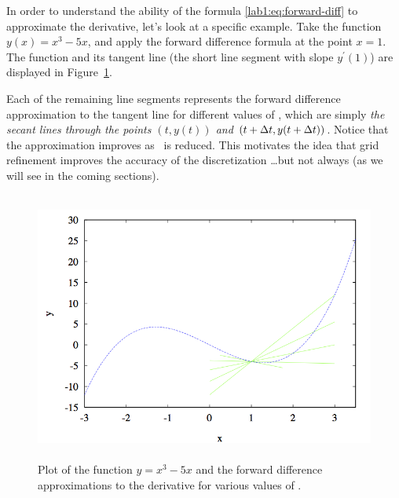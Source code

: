 \begin{example}
\begin{latexonly}
  In order to understand the ability of the formula
  \eqref{lab1:eq:forward-diff} to approximate the derivative, 
  let's look at a specific example.
  Take the function $y(x)=x^3-5x$, and apply the forward difference
  formula at the point $x=1$.  The function and its tangent line (the
  short line segment with slope $y^\prime(1)$) are displayed in
  Figure~\ref{lab1:fig:deriv}.
  
  Each of the remaining line segments represents the forward
  difference approximation to the tangent line for different values of
  \dt, which are simply \emph{the secant lines through the points
    $(t,y(t))$ and $(t+\mbox{$\Delta t$}{},y(t+\mbox{$\Delta t$}{}))$}.
  Notice that the approximation improves as \dt\ is reduced.
  This motivates the idea that grid refinement improves the accuracy
  of the discretization \dots but not always (as we will see in
  the coming sections).
  \begin{figure}[htbp]
    \begin{center}
      \leavevmode
      \includegraphics[height=3.5in]{deriv/deriv}      
      \caption{Plot of the function $y=x^3-5x$ and the forward difference approximations to the derivative for various values of \dt.}
      \label{lab1:fig:deriv}
    \end{center}
  \end{figure}
\end{latexonly}



\end{example}

